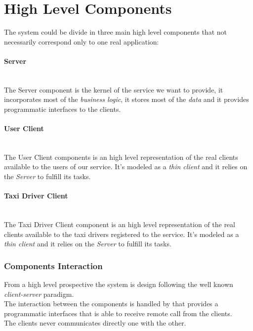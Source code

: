\section{High Level Components} %
\label{sec:high_level_components}
The system could be divide in three main high level components that not necessarily correspond only to one real application:
\paragraph{Server} %
\label{comp:server}\hfill \\
The Server component is the kernel of the service we want to provide, it incorporates most of the \emph{business logic}, it stores most of the \emph{data} and it provides programmatic interfaces to the clients.
\paragraph{User Client} %
\label{comp:user_client}\hfill \\
The User Client components is an high level representation of the real clients available to the users of our service. It's modeled as a \emph{thin client} and it relies on the \emph{Server} to fulfill its tasks.
\paragraph{Taxi Driver Client} %
\label{par:taxi_driver_client}\hfill \\
The Taxi Driver Client component is an high level representation of the real clients available to the taxi drivers registered to the service. It's modeled as a \emph{thin client} and it relies on the \emph{Server} to fulfill its tasks.


\subsubsection{Components Interaction} %
\label{ssub:components_interaction}
From a high level prospective the system is design following the well known \emph{client-server} paradigm.\\
The interaction between the components is handled by  that provides a programmatic interfaces that is able to receive remote call from the clients.\\
The clients never communicates directly one with the other.

